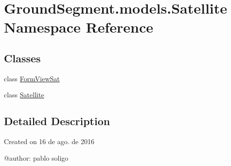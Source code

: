 \hypertarget{namespace_ground_segment_1_1models_1_1_satellite}{}\section{Ground\+Segment.\+models.\+Satellite Namespace Reference}
\label{namespace_ground_segment_1_1models_1_1_satellite}
\subsection*{Classes}
\begin{DoxyCompactItemize}
\item 
class \hyperlink{class_ground_segment_1_1models_1_1_satellite_1_1_form_view_sat}{Form\+View\+Sat}
\item 
class \hyperlink{class_ground_segment_1_1models_1_1_satellite_1_1_satellite}{Satellite}
\end{DoxyCompactItemize}


\subsection{Detailed Description}
\begin{DoxyVerb}Created on 16 de ago. de 2016

@author: pablo soligo
\end{DoxyVerb}
 
